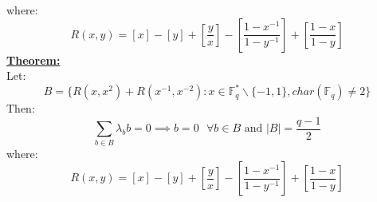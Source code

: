 \documentclass[11pt]{article}
\theoremstyle{plain}
\theoremstyle{definition}
\begin{document}
where:
\begin{equation*}
R(x,y) = [x] - [y] + [\frac{y}{x}] - [\frac{1-x^{-1}}{1-y^{-1}}] + [\frac{1-x}{1-y}]
\end{equation*}
\textbf{\underline{Theorem:}}\\
Let:
\begin{equation*}
B = \{ R(x, x^2) + R(x^{-1},x^{-2}) : x \in \mathbb{F}_q ^* \backslash \{-1,1\}, char(\mathbb{F}_q) \neq 2 \} \end{equation*}
Then:
\begin{equation*}
\sum_{b \in B} \lambda_b b = 0 \implies b=0 \text{ } \forall  b \in B \text{ and } |B| = \frac{q-1}{2}
\end{equation*}
where:
\begin{equation*}
R(x,y) = [x] - [y] + [\frac{y}{x}] - [\frac{1-x^{-1}}{1-y^{-1}}] + [\frac{1-x}{1-y}]
\end{equation*}
\pagebreak
\end{document}
